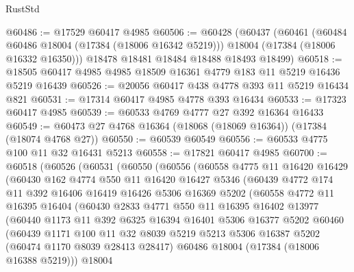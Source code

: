 \begin{lexlean}{RustStd}
\begin{coremodule}
@60486 := @17529 @60417 @4985
@60506 := @60428
    (@60437
      (@60461
        (@60484 @60486 @18004 (@17384 (@18006 @16342 @5219)))
        @18004
        (@17384 (@18006 @16332 @16350)))
      @18478
      @18481
      @18484
      @18488
      @18493
      @18499)
@60518 := @18505 @60417 @4985 @4985 @18509 @16361 @4779 @183 @11 @5219 @16436 @5219 @16439
@60526 := @20056 @60417 @438 @4778 @393 @11 @5219 @16434 @821
@60531 := @17314 @60417 @4985 @4778 @393 @16434
@60533 := @17323 @60417 @4985
@60539 := @60533 @4769 @4777 @27 @392 @16364 @16433
@60549 := @60473 @27 @4768 @16364 (@18068 (@18069 @16364)) (@17384 (@18074 @4768 @27))
@60550 := @60539 @60549
@60556 := @60533 @4775 @100 @11 @32 @16431 @5213
@60558 := @17821 @60417 @4985
@60700 := @60518
    (@60526
      (@60531
        (@60550
          (@60556
            (@60558
              @4775
              @11
              @16420
              @16429
              (@60430
                @162
                @4774
                @550
                @11
                @16420
                @16427
                @5346
                (@60439
                  @4772
                  @174
                  @11
                  @392
                  @16406
                  @16419
                  @16426
                  @5306
                  @16369
                  @5202
                  (@60558
                    @4772
                    @11
                    @16395
                    @16404
                    (@60430
                      @2833
                      @4771
                      @550
                      @11
                      @16395
                      @16402
                      @13977
                      (@60440
                        @1173
                        @11
                        @392
                        @6325
                        @16394
                        @16401
                        @5306
                        @16377
                        @5202
                        @60460
                        (@60439
                          @1171
                          @100
                          @11
                          @32
                          @8039
                          @5219
                          @5213
                          @5306
                          @16387
                          @5202
                          (@60474 @1170 @8039 @28413 @28417)
                          @60486
                          @18004
                          (@17384 (@18006 @16388 @5219)))
                        @18004

\end{coremodule}
\end{lexlean}
